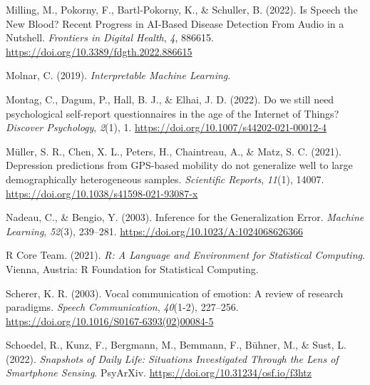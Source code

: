 \documentclass[
  man,floatsintext]{apa6}
\newlength{\cslhangindent}
\newlength{\cslentryspacingunit} %
\newenvironment{CSLReferences}[2] %
 {%
  \setlength{\parindent}{0pt}
  \ifodd #1
  \let\oldpar\par
  \def\par{\hangindent=\cslhangindent\oldpar}
  \fi
  \setlength{\parskip}{#2\cslentryspacingunit}
 }%
 {}
\begin{document}
\begin{CSLReferences}{1}{0}
\leavevmode{}%
Milling, M., Pokorny, F., Bartl-Pokorny, K., \& Schuller, B. (2022). Is {Speech} the {New Blood}? {Recent Progress} in {AI-Based Disease Detection From Audio} in a {Nutshell}. \emph{Frontiers in Digital Health}, \emph{4}, 886615. \url{https://doi.org/10.3389/fdgth.2022.886615}

\leavevmode{}%
Molnar, C. (2019). \emph{Interpretable {Machine Learning}}.

\leavevmode{}%
Montag, C., Dagum, P., Hall, B. J., \& Elhai, J. D. (2022). Do we still need psychological self-report questionnaires in the age of the {Internet} of {Things}? \emph{Discover Psychology}, \emph{2}(1), 1. \url{https://doi.org/10.1007/s44202-021-00012-4}

\leavevmode{}%
Müller, S. R., Chen, X. L., Peters, H., Chaintreau, A., \& Matz, S. C. (2021). Depression predictions from {GPS-based} mobility do not generalize well to large demographically heterogeneous samples. \emph{Scientific Reports}, \emph{11}(1), 14007. \url{https://doi.org/10.1038/s41598-021-93087-x}

\leavevmode{}%
Nadeau, C., \& Bengio, Y. (2003). Inference for the {Generalization Error}. \emph{Machine Learning}, \emph{52}(3), 239--281. \url{https://doi.org/10.1023/A:1024068626366}

\leavevmode{}%
R Core Team. (2021). \emph{R: {A Language} and {Environment} for {Statistical Computing}}. {Vienna, Austria}: R Foundation for Statistical Computing.

\leavevmode{}%
Scherer, K. R. (2003). Vocal communication of emotion: {A} review of research paradigms. \emph{Speech Communication}, \emph{40}(1-2), 227--256. \url{https://doi.org/10.1016/S0167-6393(02)00084-5}

\leavevmode{}%
Schoedel, R., Kunz, F., Bergmann, M., Bemmann, F., Bühner, M., \& Sust, L. (2022). \emph{Snapshots of {Daily Life}: {Situations Investigated Through} the {Lens} of {Smartphone Sensing}}. {PsyArXiv}. \url{https://doi.org/10.31234/osf.io/f3htz}


\end{CSLReferences}
\end{document}
